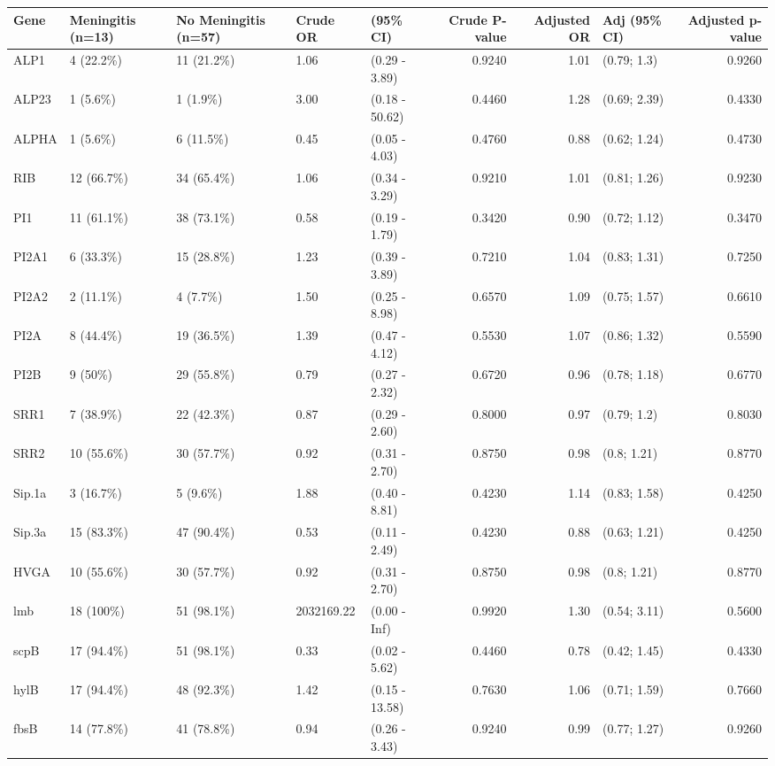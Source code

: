 \begin{table}[ht]
\centering
\begin{tabular}{lllllrrlr}
  \hline
Gene & Meningitis (n=13) & No Meningitis (n=57) & Crude OR & (95\% CI) & Crude P-value & Adjusted OR & Adj (95\% CI) & Adjusted p-value \\ 
  \hline
ALP1 & 4 (22.2\%) & 11 (21.2\%) & 1.06 & (0.29 - 3.89) & 0.9240 & 1.01 & (0.79; 1.3) & 0.9260 \\ 
  ALP23 & 1 (5.6\%) & 1 (1.9\%) & 3.00 & (0.18 - 50.62) & 0.4460 & 1.28 & (0.69; 2.39) & 0.4330 \\ 
  ALPHA & 1 (5.6\%) & 6 (11.5\%) & 0.45 & (0.05 - 4.03) & 0.4760 & 0.88 & (0.62; 1.24) & 0.4730 \\ 
  RIB & 12 (66.7\%) & 34 (65.4\%) & 1.06 & (0.34 - 3.29) & 0.9210 & 1.01 & (0.81; 1.26) & 0.9230 \\ 
  PI1 & 11 (61.1\%) & 38 (73.1\%) & 0.58 & (0.19 - 1.79) & 0.3420 & 0.90 & (0.72; 1.12) & 0.3470 \\ 
  PI2A1 & 6 (33.3\%) & 15 (28.8\%) & 1.23 & (0.39 - 3.89) & 0.7210 & 1.04 & (0.83; 1.31) & 0.7250 \\ 
  PI2A2 & 2 (11.1\%) & 4 (7.7\%) & 1.50 & (0.25 - 8.98) & 0.6570 & 1.09 & (0.75; 1.57) & 0.6610 \\ 
  PI2A & 8 (44.4\%) & 19 (36.5\%) & 1.39 & (0.47 - 4.12) & 0.5530 & 1.07 & (0.86; 1.32) & 0.5590 \\ 
  PI2B & 9 (50\%) & 29 (55.8\%) & 0.79 & (0.27 - 2.32) & 0.6720 & 0.96 & (0.78; 1.18) & 0.6770 \\ 
  SRR1 & 7 (38.9\%) & 22 (42.3\%) & 0.87 & (0.29 - 2.60) & 0.8000 & 0.97 & (0.79; 1.2) & 0.8030 \\ 
  SRR2 & 10 (55.6\%) & 30 (57.7\%) & 0.92 & (0.31 - 2.70) & 0.8750 & 0.98 & (0.8; 1.21) & 0.8770 \\ 
  Sip.1a & 3 (16.7\%) & 5 (9.6\%) & 1.88 & (0.40 - 8.81) & 0.4230 & 1.14 & (0.83; 1.58) & 0.4250 \\ 
  Sip.3a & 15 (83.3\%) & 47 (90.4\%) & 0.53 & (0.11 - 2.49) & 0.4230 & 0.88 & (0.63; 1.21) & 0.4250 \\ 
  HVGA & 10 (55.6\%) & 30 (57.7\%) & 0.92 & (0.31 - 2.70) & 0.8750 & 0.98 & (0.8; 1.21) & 0.8770 \\ 
  lmb & 18 (100\%) & 51 (98.1\%) & 2032169.22 & (0.00 - Inf) & 0.9920 & 1.30 & (0.54; 3.11) & 0.5600 \\ 
  scpB & 17 (94.4\%) & 51 (98.1\%) & 0.33 & (0.02 - 5.62) & 0.4460 & 0.78 & (0.42; 1.45) & 0.4330 \\ 
  hylB & 17 (94.4\%) & 48 (92.3\%) & 1.42 & (0.15 - 13.58) & 0.7630 & 1.06 & (0.71; 1.59) & 0.7660 \\ 
  fbsB & 14 (77.8\%) & 41 (78.8\%) & 0.94 & (0.26 - 3.43) & 0.9240 & 0.99 & (0.77; 1.27) & 0.9260 \\ 
   \hline
\end{tabular}
\end{table}
